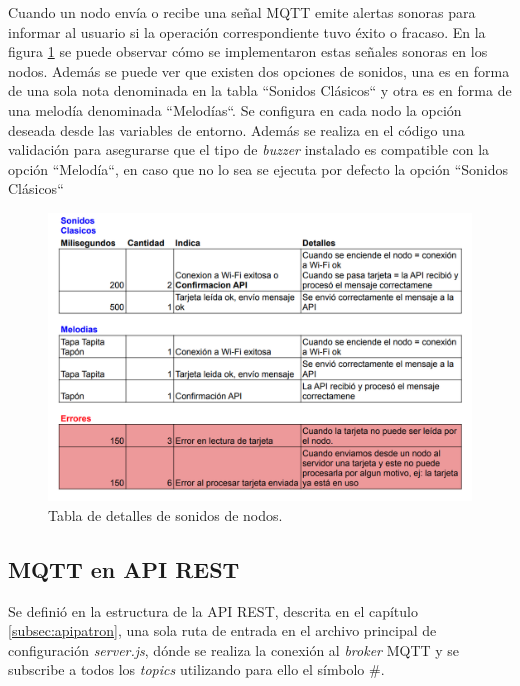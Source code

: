 Cuando un nodo envía o recibe una señal MQTT emite alertas sonoras para informar al usuario si la operación correspondiente tuvo éxito o fracaso. En la figura \ref{fig:mqttsonidosnodos} se puede observar cómo se implementaron estas señales sonoras en los nodos. Además se puede ver que existen dos opciones de sonidos, una es en forma de una sola nota denominada en la tabla ``Sonidos Clásicos`` y otra es en forma de una melodía denominada ``Melodías``. Se configura en cada nodo la opción deseada desde las variables de entorno. Además se realiza en el código una validación para asegurarse que el tipo de \textit{buzzer} instalado es compatible con la opción ``Melodía``, en caso que no lo sea se ejecuta por defecto la opción ``Sonidos Clásicos``

\begin{figure}[H]
	\centering
	\includegraphics[width=\textwidth]{./Figures/nodos-beeps.png}
	\caption{Tabla de detalles de sonidos de nodos.}
	\label{fig:mqttsonidosnodos}
\end{figure}



\subsection{MQTT en API REST}
\label{subsec:mqttapi}

Se definió en la estructura de la API REST, descrita en el capítulo \ref{subsec:apipatron}, una sola ruta de entrada en el archivo principal de configuración \textit{server.js}, dónde se realiza la conexión al \textit{broker} MQTT y se subscribe a todos los \textit{topics} utilizando para ello el símbolo \#. 

